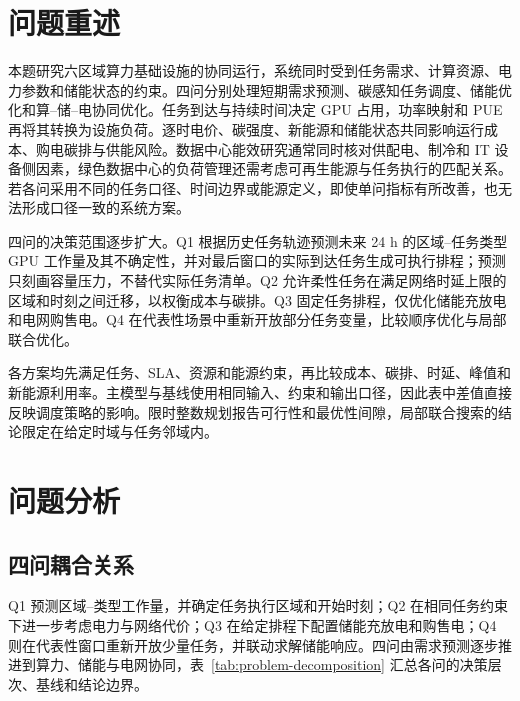 \section{问题重述}

本题研究六区域算力基础设施的协同运行，系统同时受到任务需求、计算资源、电力参数和储能状态的约束。四问分别处理短期需求预测、碳感知任务调度、储能优化和算--储--电协同优化。任务到达与持续时间决定 GPU 占用，功率映射和 PUE 再将其转换为设施负荷。逐时电价、碳强度、新能源和储能状态共同影响运行成本、购电碳排与供能风险。数据中心能效研究通常同时核对供配电、制冷和 IT 设备侧因素，绿色数据中心的负荷管理还需考虑可再生能源与任务执行的匹配关系。若各问采用不同的任务口径、时间边界或能源定义，即使单问指标有所改善，也无法形成口径一致的系统方案。

四问的决策范围逐步扩大。Q1 根据历史任务轨迹预测未来 24 h 的区域--任务类型 GPU 工作量及其不确定性，并对最后窗口的实际到达任务生成可执行排程；预测只刻画容量压力，不替代实际任务清单。Q2 允许柔性任务在满足网络时延上限的区域和时刻之间迁移，以权衡成本与碳排。Q3 固定任务排程，仅优化储能充放电和电网购售电。Q4 在代表性场景中重新开放部分任务变量，比较顺序优化与局部联合优化。

各方案均先满足任务、SLA、资源和能源约束，再比较成本、碳排、时延、峰值和新能源利用率。主模型与基线使用相同输入、约束和输出口径，因此表中差值直接反映调度策略的影响。限时整数规划报告可行性和最优性间隙，局部联合搜索的结论限定在给定时域与任务邻域内。

\section{问题分析}

\subsection{四问耦合关系}

Q1 预测区域--类型工作量，并确定任务执行区域和开始时刻；Q2 在相同任务约束下进一步考虑电力与网络代价；Q3 在给定排程下配置储能充放电和购售电；Q4 则在代表性窗口重新开放少量任务，并联动求解储能响应。四问由需求预测逐步推进到算力、储能与电网协同，表~\ref{tab:problem-decomposition} 汇总各问的决策层次、基线和结论边界。

